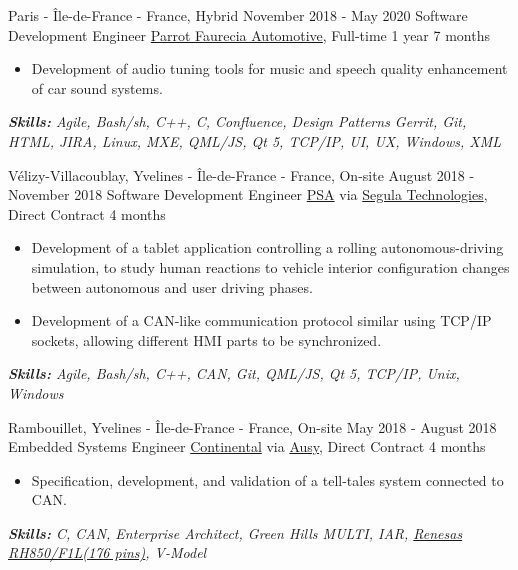 \documentclass[11pt,a4paper,roman]{moderncv}
\begin{document}
\cventry
{Paris - Île-de-France - France, Hybrid}
{November 2018 - May 2020}
{Software Development Engineer}
{\href{https://www.faurecia-clarion.com}{Parrot Faurecia Automotive}, Full-time}
{1 year 7 months}
{}
{
\begin{itemize}
\item Development of audio tuning tools for music and speech quality enhancement of car sound systems.
\end{itemize}
{\textcolor{color2}{\textit{\textbf{Skills:}
	Agile,
	Bash/sh,
	C++,
	C,
	Confluence,
	Design Patterns
	Gerrit,
	Git,
	HTML,
	JIRA,
	Linux,
	MXE,
	QML/JS,
	Qt 5,
	TCP/IP,
	UI,
	UX,
	Windows,
	XML
	\newline
}}}}

\cventry
{Vélizy-Villacoublay, Yvelines - Île-de-France - France, On-site}
{August 2018 - November 2018}
{Software Development Engineer}
{\href{https://www.groupe-psa.com/en/}{PSA} via \href{https://www.segulatechnologies.com/en/}{Segula Technologies}, Direct Contract}
{4 months}
{}
{
\begin{itemize}
	\item Development of a tablet application controlling a rolling autonomous-driving simulation, to study human reactions to vehicle interior configuration changes between autonomous and user driving phases.
	\item Development of a CAN-like communication protocol similar using TCP/IP sockets, allowing different HMI parts to be synchronized.
\end{itemize}
{\textcolor{color2}{\textit{\textbf{Skills:}
	Agile,
	Bash/sh,
	C++,
	CAN,
	Git,
	QML/JS,
	Qt 5,
	TCP/IP,
	Unix,
	Windows
	\newline
}}}}


\cventry
{Rambouillet, Yvelines - Île-de-France - France, On-site}
{May 2018 - August 2018}
{Embedded Systems Engineer}
{\href{https://www.continental.com/en}{Continental} via \href{https://www.ausy.com/en}{Ausy}, Direct Contract}
{4 months}
{}
{
\begin{itemize}
	\item Specification, development, and validation of a tell-tales system connected to CAN.
\end{itemize}
{\textcolor{color2}{\textit{\textbf{Skills:}
	C,
	CAN,
	Enterprise Architect,
	Green Hills MULTI,
	IAR,
	\href{https://www.renesas.com/eu/en/products/microcontrollers-microprocessors/rh850/rh850f1x/rh850f1l.html}{Renesas RH850/F1L(176 pins)},
	V-Model
	\newline
}}}}
\end{document}

